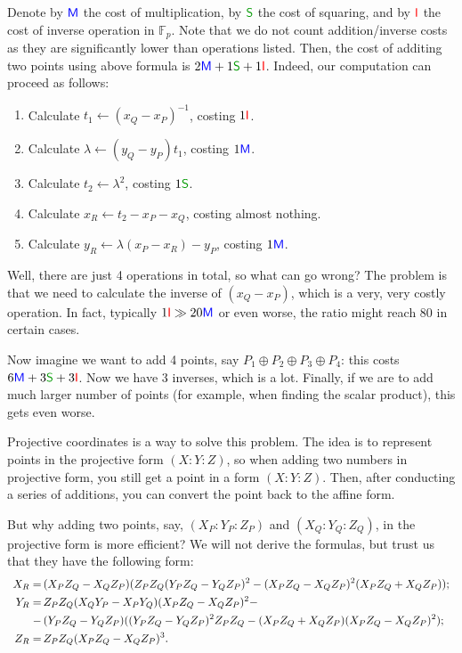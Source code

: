 \documentclass[../lecture-notes-148x210.tex]{subfiles}
\begin{document}
Denote by $\textcolor{blue}{\mathsf{M}}$ the cost of multiplication, by $\textcolor{green!60!black}{\mathsf{S}}$ the cost of squaring, and by $\textcolor{red}{\mathsf{I}}$ the cost of inverse operation in $\mathbb{F}_p$. Note that we do not count addition/inverse costs as they are significantly lower than operations listed. Then, the cost of additing two points using above formula is $2\textcolor{blue}{\mathsf{M}} + 1\textcolor{green!60!black}{\mathsf{S}} + 1\textcolor{red}{\mathsf{I}}$. Indeed, our computation can proceed as follows:
\begin{enumerate}
    \item Calculate $t_1 \gets (x_Q-x_P)^{-1}$, costing $1\textcolor{red}{\mathsf{I}}$.
    \item Calculate $\lambda \gets (y_Q-y_P)t_1$, costing $1\textcolor{blue}{\mathsf{M}}$.
    \item Calculate $t_2 \gets \lambda^2$, costing $1\textcolor{green!60!black}{\mathsf{S}}$.
    \item Calculate $x_R \gets t_2 - x_P - x_Q$, costing almost nothing.
    \item Calculate $y_R \gets \lambda (x_P-x_R) - y_P$, costing $1\textcolor{blue}{\mathsf{M}}$.
\end{enumerate}

Well, there are just 4 operations in total, so what can go wrong? The problem is that we need to calculate the inverse of $(x_Q-x_P)$, which is a very, very costly operation. In fact, typically $1\textcolor{red}{\mathsf{I}} \gg 20\textcolor{blue}{\mathsf{M}}$ or even worse, the ratio might reach $80$ in certain cases.

Now imagine we want to add 4 points, say $P_1 \oplus P_2 \oplus P_3 \oplus P_4$: this costs $6\textcolor{blue}{\mathsf{M}} + 3\textcolor{green!60!black}{\mathsf{S}} + 3\textcolor{red}{\mathsf{I}}$. Now we have 3 inverses, which is a lot. Finally, if we are to add much larger number of points (for example, when finding the scalar product), this gets even worse. 

Projective coordinates is a way to solve this problem. The idea is to represent points in the projective form $(X:Y:Z)$, so when adding two numbers in projective form, you still get a point in a form $(X:Y:Z)$. Then, after conducting a series of additions, you can convert the point back to the affine form. 

But why adding two points, say, $(X_P:Y_P:Z_P)$ and $(X_Q:Y_Q:Z_Q)$, in the projective form is more efficient? We will not derive the formulas, but trust us that they have the following form:
\begin{equation*}
    \scalebox{0.9}{$
    \begin{aligned}
        X_R = \, &(X_PZ_Q - X_QZ_P)(Z_PZ_Q(Y_PZ_Q-Y_QZ_P)^2 - (X_PZ_Q-X_QZ_P)^2(X_PZ_Q+X_QZ_P)); \\
        Y_R = \, &Z_PZ_Q(X_QY_P - X_PY_Q)(X_PZ_Q-X_QZ_P)^2 - \\ - \, &(Y_PZ_Q-Y_QZ_P)((Y_PZ_Q-Y_QZ_P)^2Z_PZ_Q-(X_PZ_Q+X_QZ_P)(X_PZ_Q-X_QZ_P)^2); \\
        Z_R = \, &Z_PZ_Q(X_PZ_Q - X_QZ_P)^3.
    \end{aligned}
    $}
\end{equation*}
\end{document}
